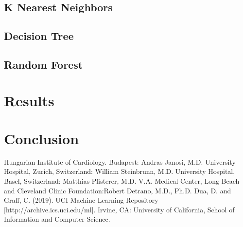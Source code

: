 \documentclass[conference]{IEEEtran}
\begin{document}
\subsection{K Nearest Neighbors}

\subsection{Decision Tree}

\subsection{Random Forest}

\section{Results}

\section{Conclusion}

\begin{thebibliography}{00}
     Hungarian Institute of Cardiology. Budapest: Andras Janosi, M.D.
     University Hospital, Zurich, Switzerland: William Steinbrunn, M.D.
     University Hospital, Basel, Switzerland: Matthias Pfisterer, M.D.
     V.A. Medical Center, Long Beach and Cleveland Clinic Foundation:Robert Detrano, M.D., Ph.D.
     Dua, D. and Graff, C. (2019). UCI Machine Learning Repository [http://archive.ics.uci.edu/ml]. Irvine, CA: University of California, School of Information and Computer Science.
\end{thebibliography}
\end{document}
